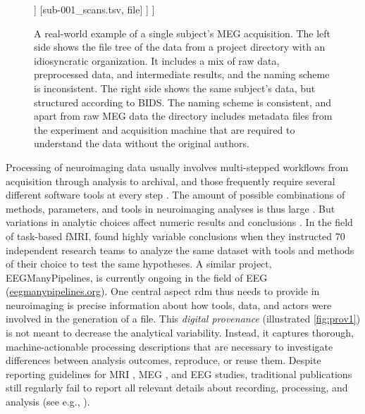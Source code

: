 \begin{figure}
{\begin{minipage}{.49\textwidth}
\begin{forest}
		]
		[sub-001\_scans.tsv, file]
		]
		]
	\end{forest}
\end{minipage}
}
\caption[An example of BIDS]{A real-world example of a single subject's MEG acquisition. The left side shows the file tree of the data from a project directory with an idiosyncratic organization. It includes a mix of raw data, preprocessed data, and intermediate results, and the naming scheme is inconsistent. The right side shows the same subject's data, but structured according to \gls{BIDS}. The naming scheme is consistent, and apart from raw MEG data the directory includes metadata files from the experiment and acquisition machine that are required to understand the data without the original authors.}
\label{fig:BIDS}
\end{figure}

Processing of neuroimaging data usually involves multi-stepped workflows from acquisition through analysis to archival, and those frequently require several different software tools at every step \citep{poline2011}\citep{NISO2022119623}.
The amount of possible combinations of methods, parameters, and tools in neuroimaging analyses is thus large \citep{bowring2019exploring}.
But variations in analytic choices affect numeric results and conclusions \citep{silberzahn2018}.
In the field of task-based fMRI, \citet{botvinik2020variability} found highly variable conclusions when they instructed 70 independent research teams to analyze the same dataset with tools and methods of their choice to test the same hypotheses.
A similar project, EEGManyPipelines, is currently ongoing in the field of EEG (\href{https://eegmanypipelines.org/}{eegmanypipelines.org}).
One central aspect \gls{rdm} thus needs to provide in neuroimaging is precise information about how tools, data, and actors were involved in the generation of a file.
This \textit{digital provenance}  (illustrated \cref{fig:prov1}) is not meant to decrease the analytical variability.
Instead, it captures thorough, machine-actionable processing descriptions that are necessary to investigate differences between analysis outcomes, reproduce, or reuse them.
Despite reporting guidelines for MRI \citep{nichols2017best}, MEG \citep{pernet2020issues}, and EEG \citep{styles2021towards} studies, traditional publications still regularly fail to report all relevant details about recording, processing, and analysis (see e.g., \citet{vsovskic2022better}).

